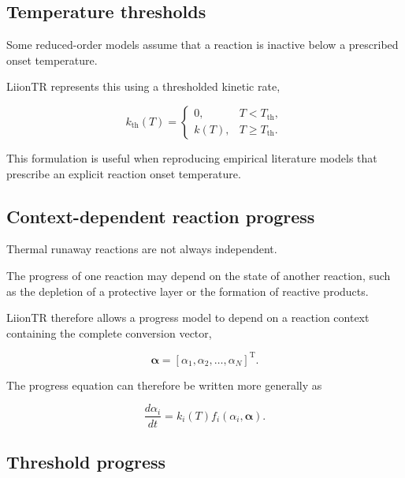 \subsection{Temperature thresholds}

Some reduced-order models assume that a reaction is inactive below a
prescribed onset temperature.

LiionTR represents this using a thresholded kinetic rate,

\begin{equation}
    k_{\mathrm{th}}(T)
    =
    \begin{cases}
        0,
        & T < T_{\mathrm{th}},
        \\[6pt]
        k(T),
        & T \geq T_{\mathrm{th}}.
    \end{cases}
    \label{eq:temperature_threshold}
\end{equation}

This formulation is useful when reproducing empirical literature models
that prescribe an explicit reaction onset temperature.


\subsection{Context-dependent reaction progress}

Thermal runaway reactions are not always independent.

The progress of one reaction may depend on the state of another
reaction, such as the depletion of a protective layer or the formation
of reactive products.

LiionTR therefore allows a progress model to depend on a reaction
context containing the complete conversion vector,

\begin{equation}
    \boldsymbol{\alpha}
    =
    \left[
        \alpha_1,
        \alpha_2,
        \ldots,
        \alpha_N
    \right]^{\mathrm{T}}.
\end{equation}

The progress equation can therefore be written more generally as

\begin{equation}
    \frac{d\alpha_i}{dt}
    =
    k_i(T)
    f_i
    \left(
        \alpha_i,
        \boldsymbol{\alpha}
    \right).
\end{equation}


\subsection{Threshold progress}

